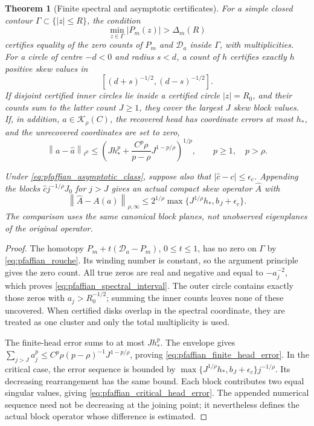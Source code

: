 \documentclass[11pt,a4paper]{amsart}
\numberwithin{equation}{section}
\newtheorem{theorem}{Theorem}[section]
\theoremstyle{definition}
\theoremstyle{remark}
\newcommand{\norm}[1]{\left\lVert#1\right\rVert}
\begin{document}
\begin{theorem}[Finite spectral and asymptotic certificates]\label{thm:pfaffian_contours}
For a simple closed contour $\Gamma\subset\{|z|\le R\}$, the condition
\begin{equation}\label{eq:pfaffian_rouche}
 \min_{z\in\Gamma}|P_m(z)|>\Delta_m(R)
\end{equation}
certifies equality of the zero counts of $P_m$ and $\mathscr D_a$ inside $\Gamma$, with multiplicities. For a circle of centre $-d<0$ and radius $s<d$, a count of $h$ certifies exactly $h$ positive skew values in
\begin{equation}\label{eq:pfaffian_spectral_interval}
 [(d+s)^{-1/2},(d-s)^{-1/2}].
\end{equation}
If disjoint certified inner circles lie inside a certified circle $|z|=R_0$, and their counts sum to the latter count $J\ge1$, they cover the largest $J$ skew block values. If, in addition, $a\in\mathcal K_\rho(C)$, the recovered head has coordinate errors at most $h_*$, and the unrecovered coordinates are set to zero,
\begin{equation}\label{eq:pfaffian_finite_head_error}
 \norm{a-\widehat a}_{\ell^p}
 \le\left(Jh_*^p+\frac{C^p\rho}{p-\rho}J^{1-p/\rho}\right)^{1/p},
 \qquad p\ge1,\quad p>\rho.
\end{equation}

Under \eqref{eq:pfaffian_asymptotic_class}, suppose also that
$|\widehat c-c|\le\epsilon_c$. Appending the blocks
$\widehat c j^{-1/\rho}J_0$ for $j>J$ gives an actual compact skew operator $\widehat A$ with
\begin{equation}\label{eq:pfaffian_critical_head_error}
 \norm{\widehat A-A(a)}_{\rho,\infty}
 \le2^{1/\rho}\max\{J^{1/\rho}h_*,b_J+\epsilon_c\}.
\end{equation}
The comparison uses the same canonical block planes, not unobserved eigenplanes of the original operator.
\end{theorem}
\begin{proof}
The homotopy $P_m+t(\mathscr D_a-P_m)$, $0\le t\le1$, has no zero on $\Gamma$ by \eqref{eq:pfaffian_rouche}. Its winding number is constant, so the argument principle gives the zero count. All true zeros are real and negative and equal to $-a_j^{-2}$, which proves \eqref{eq:pfaffian_spectral_interval}. The outer circle contains exactly those zeros with $a_j>R_0^{-1/2}$; summing the inner counts leaves none of these uncovered. When certified disks overlap in the spectral coordinate, they are treated as one cluster and only the total multiplicity is used.

The finite-head error sums to at most $Jh_*^p$. The envelope gives
$\sum_{j>J}a_j^p\le C^p\rho(p-\rho)^{-1}J^{1-p/\rho}$, proving \eqref{eq:pfaffian_finite_head_error}. In the critical case, the error sequence is bounded by
$\max\{J^{1/\rho}h_*,b_J+\epsilon_c\}j^{-1/\rho}$. Its decreasing rearrangement has the same bound. Each block contributes two equal singular values, giving \eqref{eq:pfaffian_critical_head_error}. The appended numerical sequence need not be decreasing at the joining point; it nevertheless defines the actual block operator whose difference is estimated.
\end{proof}
\end{document}
